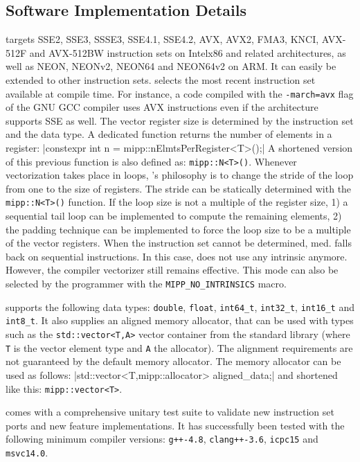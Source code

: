 \subsection{Software Implementation Details}
\label{sec:opt_mipp_implem}

\MIPP targets SSE2, SSE3, SSSE3, SSE4.1, SSE4.2, AVX, AVX2, FMA3, KNCI, AVX-512F
and AVX-512BW instruction sets on Intel\R x86 and related architectures, as well
as NEON, NEONv2, NEON64 and NEON64v2 on ARM\R. It can easily be extended to
other instruction sets. \MIPP selects the most recent instruction set available
at compile time. For instance, a code compiled with the \verb|-march=avx| flag
of the GNU GCC compiler uses AVX instructions even if the architecture supports
SSE as well. The vector register size is determined by the instruction set and
the data type. A dedicated function returns the number of elements in a \MIPP
register:
|constexpr int n = mipp::nElmtsPerRegister<T>();|
{\noindent
A shortened version of this previous function is also defined as:
\verb|mipp::N<T>()|. Whenever vectorization takes place in loops, \MIPP's
philosophy is to change the stride of the loop from one to the size of
registers. The stride can be statically determined with the \verb|mipp::N<T>()|
function. If the loop size is not a multiple of the register size, 1) a
sequential tail loop can be implemented to compute the remaining elements, 2)
the padding technique can be implemented to force the loop size to be a multiple
of the vector registers. When the instruction set cannot be determined, \MIPP
med. falls back on sequential instructions. In this case, \MIPP does not use any
intrinsic anymore. However, the compiler vectorizer still remains effective.
This mode can also be selected by the programmer with the
\verb|MIPP_NO_INTRINSICS| macro.
}

\MIPP supports the following data types: \verb|double|, \verb|float|,
\verb|int64_t|, \verb|int32_t|, \verb|int16_t| and \verb|int8_t|. It also
supplies an aligned memory allocator, that can be used with types such as the
\verb|std::vector<T,A>| vector container from the \Cxx standard library (where
\verb|T| is the vector element type and \verb|A| the allocator). The alignment
requirements are not guaranteed by the default \Cxx memory allocator. The \MIPP
memory allocator can be used as follows:
|std::vector<T,mipp::allocator> aligned_data;|
{\noindent
and shortened like this: \verb|mipp::vector<T>|.
}

\MIPP comes with a comprehensive unitary test suite to validate new instruction
set ports and new feature implementations. It has successfully been tested with
the following minimum compiler versions: \verb|g++-4.8|, \verb|clang++-3.6|,
\verb|icpc15| and \verb|msvc14.0|.

